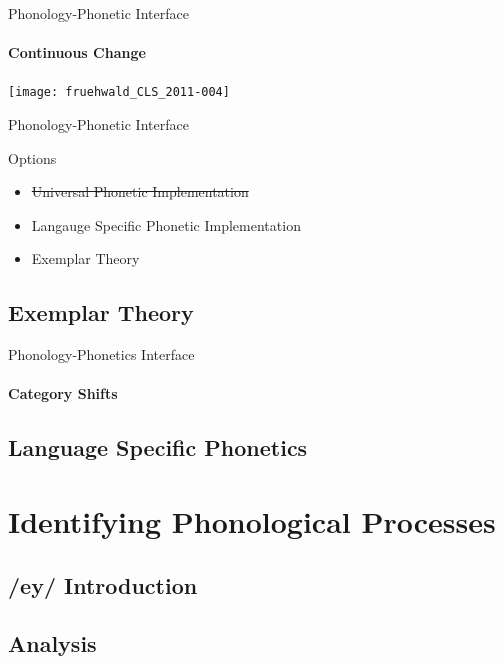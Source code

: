 \documentclass[]{beamer}
\begin{document}
\begin{frame}{Phonology-Phonetic Interface}
	\framesubtitle{Continuous Change}

\texttt{[image: fruehwald\_CLS\_2011-004]}
	
	
\end{frame}

\begin{frame}{Phonology-Phonetic Interface}

	\begin{block}{Options}
		\begin{itemize}
			\item \sout{Universal Phonetic Implementation}
			\item Langauge Specific Phonetic Implementation
			\item Exemplar Theory
		\end{itemize}
	\end{block}

\end{frame}

\subsection{Exemplar Theory}

\begin{frame}{Phonology-Phonetics Interface}
	\framesubtitle{Category Shifts}
	

\end{frame}


\subsection{Language Specific Phonetics}





\section{Identifying Phonological Processes}



\subsection{/ey/ Introduction}

\subsection{Analysis}
\end{document}

